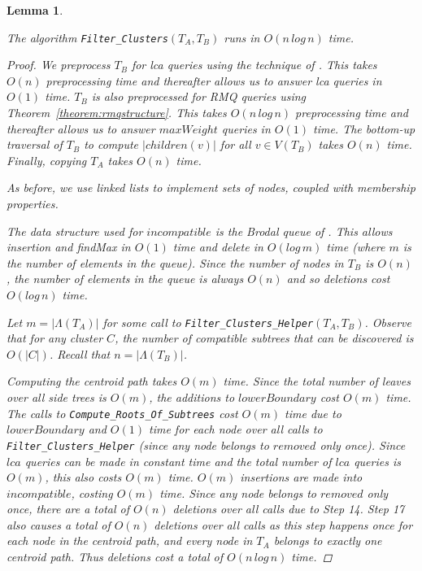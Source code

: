 \documentclass{article}
\newcommand{\leafset}{\Lambda}
\newtheorem{filterclustersruntime}[incompatibility]{Lemma}
\begin{document}
    \bigskip
    \begin{filterclustersruntime}
        \label{lem:filterclustersruntime}

        The algorithm \texttt{Filter\_Clusters}$(T_A, T_B)$ runs in $O(n\,log\,n)$ time.

        \begin{proof}
            We preprocess $T_B$ for \textit{lca} queries using the technique of \cite{bender2000lca}. This takes $O(n)$ preprocessing time and thereafter allows us to answer \textit{lca} queries in $O(1)$ time. $T_B$ is also preprocessed for RMQ queries using Theorem~\ref{theorem:rmqstructure}. This takes $O(n\,log\,n)$ preprocessing time and thereafter allows us to answer $maxWeight$ queries in $O(1)$ time. The bottom-up traversal of $T_B$ to compute $|children(v)|$ for all $v \in V(T_B)$ takes $O(n)$ time. Finally, copying $T_A$ takes $O(n)$ time.

            As before, we use linked lists to implement sets of nodes, coupled with membership properties.

            The data structure used for $incompatible$ is the Brodal queue of \cite{brodal1995fast}. This allows insertion and findMax in $O(1)$ time and delete in $O(log\,m)$ time (where $m$ is the number of elements in the queue). Since the number of nodes in $T_B$ is $O(n)$, the number of elements in the queue is always $O(n)$ and so deletions cost $O(log\,n)$ time.

            Let $m = |\leafset(T_A)|$ for some call to \texttt{Filter\_Clusters\_Helper}$(T_A, T_B)$. Observe that for any cluster $C$, the number of compatible subtrees that can be discovered is $O(|C|)$. Recall that $n = |\leafset(T_B)|$.

            Computing the centroid path takes $O(m)$ time. Since the total number of leaves over all side trees is $O(m)$, the additions to $lowerBoundary$ cost $O(m)$ time. The calls to \texttt{Compute\_Roots\_Of\_Subtrees} cost $O(m)$ time due to $lowerBoundary$ and $O(1)$ time for each node over all calls to \texttt{Filter\_Clusters\_Helper} (since any node belongs to $removed$ only once). Since $lca$ queries can be made in constant time and the total number of $lca$ queries is $O(m)$, this also costs $O(m)$ time. $O(m)$ insertions are made into $incompatible$, costing $O(m)$ time. Since any node belongs to $removed$ only once, there are a total of $O(n)$ deletions over all calls due to Step 14. Step 17 also causes a total of $O(n)$ deletions over all calls as this step happens once for each node in the centroid path, and every node in $T_A$ belongs to exactly one centroid path. Thus deletions cost a total of $O(n\,log\,n)$ time.


\end{proof}
\end{filterclustersruntime}
\end{document}
